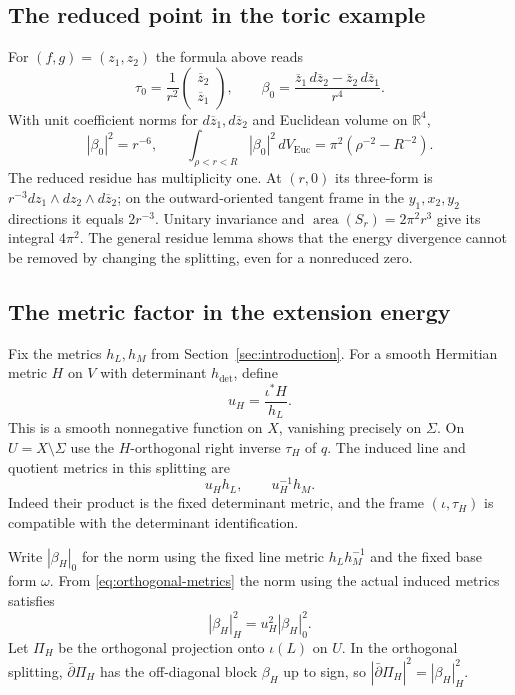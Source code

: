 \documentclass[11pt]{amsart}
\theoremstyle{definition}
\theoremstyle{remark}
\newcommand{\RR}{\mathbb R}
\newcommand{\db}{\bar\partial}
\begin{document}
\subsection{The reduced point in the toric example}
For $(f,g)=(z_1,z_2)$ the formula above reads
\begin{equation}\label{eq:beta}
 \tau_0=\frac1{r^2}\begin{pmatrix}\overline z_2\\\overline z_1\end{pmatrix},
 \qquad
 \beta_0=\frac{\overline z_1\,d\overline z_2-
                      \overline z_2\,d\overline z_1}{r^4}.
\end{equation}
With unit coefficient norms for $d\overline z_1,d\overline z_2$ and
Euclidean volume on $\RR^4$,
\begin{equation}\label{eq:beta-energy}
 |\beta_0|^2=r^{-6},\qquad
 \int_{\rho<r<R}|\beta_0|^2\,dV_{\mathrm{Euc}}
 =\pi^2(\rho^{-2}-R^{-2}).
\end{equation}
The reduced residue has multiplicity one. At $(r,0)$ its three-form
is $r^{-3}dz_1\wedge dz_2\wedge d\overline z_2$; on the outward-oriented
tangent frame in the $y_1,x_2,y_2$ directions it equals $2r^{-3}$.
Unitary invariance and $\operatorname{area}(S_r)=2\pi^2r^3$ give
its integral $4\pi^2$. The general residue lemma shows that the energy
divergence cannot be removed by changing the splitting, even for a
nonreduced zero.

\subsection{The metric factor in the extension energy}
Fix the metrics $h_L,h_M$ from Section~\ref{sec:introduction}. For a smooth
Hermitian metric $H$ on $V$ with determinant $h_{\det}$, define
\begin{equation}\label{eq:u-metric}
 u_H=\frac{\iota^*H}{h_L}.
\end{equation}
This is a smooth nonnegative function on $X$, vanishing precisely on $\Sigma$.
On $U=X\setminus\Sigma$ use the $H$-orthogonal right inverse $\tau_H$
of $q$. The induced line and quotient metrics in this splitting are
\begin{equation}\label{eq:orthogonal-metrics}
 u_H h_L,\qquad u_H^{-1}h_M.
\end{equation}
Indeed their product is the fixed determinant metric, and the frame
$(\iota,\tau_H)$ is compatible with the determinant identification.

Write $|\beta_H|_0$ for the norm using the fixed line metric
$h_Lh_M^{-1}$ and the fixed base form $\omega$. From
\eqref{eq:orthogonal-metrics} the norm using the actual induced metrics
satisfies
\begin{equation}\label{eq:weighted-beta}
 |\beta_H|_H^2=u_H^2|\beta_H|_0^2.
\end{equation}
Let $\Pi_H$ be the orthogonal projection onto $\iota(L)$ on $U$.
In the orthogonal splitting, $\db\Pi_H$ has the off-diagonal block
$\beta_H$ up to sign, so
$|\db\Pi_H|^2=|\beta_H|_H^2$.
\end{document}
